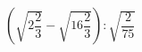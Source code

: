 \begin{ex}[type=calculate]
	\begin{condition}
		\( \left( \sqrt{2\dfrac{2}{3}}-\sqrt{16\dfrac{2}{3}} \right):\sqrt{\dfrac{2}{75}} \)
	\end{condition}
\end{ex}